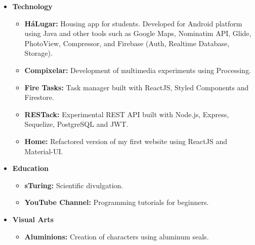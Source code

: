 \documentclass[letterpaper,11pt]{article}
\newcommand{\resumeItem}[2]{
    \item \small{\textbf{#1}{ #2 \vspace{-2pt}}}
}
\newcommand{\resumeSubItem}[2]{\resumeItem{#1}{#2}\vspace{-4pt}}
\newcommand{\resumeSubHeadingListStart}{\begin{itemize}[leftmargin=*]}
\newcommand{\resumeSubHeadingListEnd}{\end{itemize}}
\begin{document}
    \resumeSubHeadingListStart
        \resumeSubItem{Technology}{}
            \begin{itemize}
                \item \textbf{HáLugar:} Housing app for students. Developed for Android platform using Java and other tools such as Google Maps, Nominatim API, Glide, PhotoView, Compressor, and Firebase (Auth, Realtime Database, Storage). \href{https://play.google.com/store/apps/details?id=br.ufc.crateus.halugar}{\scriptsize \faExternalLink}
                \item \textbf{Compixelar:} Development of multimedia experiments using Processing. \href{https://medium.com/@danielhbrito}{\scriptsize \faExternalLink}
                \item \textbf{Fire Tasks:} Task manager built with ReactJS, Styled Components and Firestore. \href{https://github.com/DanielBrito/fire-tasks}{\scriptsize \faExternalLink}
                \item \textbf{RESTack:} Experimental REST API built with Node.js, Express, Sequelize, PostgreSQL and JWT. \href{https://github.com/DanielBrito/restack-api}{\scriptsize \faExternalLink}
                \item \textbf{Home:} Refactored version of my first website using ReactJS and Material-UI. \href{https://danielbrito.github.io/home/}{\scriptsize \faExternalLink}
            \end{itemize}
            
        \resumeSubItem{Education}{}
            \begin{itemize}
                \item \textbf{sTuring:} Scientific divulgation. \href{https://www.instagram.com/sturing.compsci/}{\scriptsize \faExternalLink}
                \item \textbf{YouTube Channel:}  Programming tutorials for beginners. \href{https://www.youtube.com/channel/UC4y3uq1d7MKDYs1LbI44Vng}{\scriptsize \faExternalLink}
            \end{itemize}
            
        \resumeSubItem{Visual Arts}{}
            \begin{itemize}
                \item \textbf{Aluminions:} Creation of characters using aluminum seals. \href{https://www.instagram.com/aluminions.13/}{\scriptsize \faExternalLink}
            \end{itemize}
            
            \vspace{0.05cm} %
    \resumeSubHeadingListEnd
\end{document}
